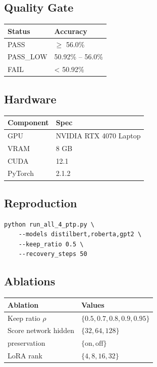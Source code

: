 \subsection{Quality Gate}

\begin{table}[H]
\centering
\small
\begin{tabular}{ll}
\toprule
\textbf{Status} & \textbf{Accuracy} \\
\midrule
PASS & $\ge$ 56.0\% \\
PASS\_LOW & 50.92\% -- 56.0\% \\
FAIL & < 50.92\% \\
\bottomrule
\end{tabular}
\end{table}

\subsection{Hardware}

\begin{table}[H]
\centering
\small
\begin{tabular}{ll}
\toprule
\textbf{Component} & \textbf{Spec} \\
\midrule
GPU & NVIDIA RTX 4070 Laptop \\
VRAM & 8 GB \\
CUDA & 12.1 \\
PyTorch & 2.1.2 \\
\bottomrule
\end{tabular}
\end{table}

\subsection{Reproduction}

\begin{lstlisting}
python run_all_4_ptp.py \
    --models distilbert,roberta,gpt2 \
    --keep_ratio 0.5 \
    --recovery_steps 50
\end{lstlisting}

\subsection{Ablations}

\begin{table}[H]
\centering
\small
\begin{tabular}{ll}
\toprule
\textbf{Ablation} & \textbf{Values} \\
\midrule
Keep ratio $\rho$ & $\{0.5, 0.7, 0.8, 0.9, 0.95\}$ \\
Score network hidden & $\{32, 64, 128\}$ \\
 [CLS] preservation & $\{\text{on}, \text{off}\}$ \\
LoRA rank & $\{4, 8, 16, 32\}$ \\
\bottomrule
\end{tabular}
\end{table}

